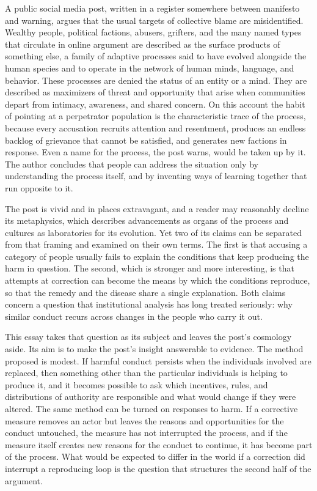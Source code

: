 \documentclass[11pt]{article}
\theoremstyle{definition}
\begin{document}
A public social media post, written in a register somewhere between manifesto and warning, argues that the usual targets of collective blame are misidentified. Wealthy people, political factions, abusers, grifters, and the many named types that circulate in online argument are described as the surface products of something else, a family of adaptive processes said to have evolved alongside the human species and to operate in the network of human minds, language, and behavior. These processes are denied the status of an entity or a mind. They are described as maximizers of threat and opportunity that arise when communities depart from intimacy, awareness, and shared concern. On this account the habit of pointing at a perpetrator population is the characteristic trace of the process, because every accusation recruits attention and resentment, produces an endless backlog of grievance that cannot be satisfied, and generates new factions in response. Even a name for the process, the post warns, would be taken up by it. The author concludes that people can address the situation only by understanding the process itself, and by inventing ways of learning together that run opposite to it.

The post is vivid and in places extravagant, and a reader may reasonably decline its metaphysics, which describes advancements as organs of the process and cultures as laboratories for its evolution. Yet two of its claims can be separated from that framing and examined on their own terms. The first is that accusing a category of people usually fails to explain the conditions that keep producing the harm in question. The second, which is stronger and more interesting, is that attempts at correction can become the means by which the conditions reproduce, so that the remedy and the disease share a single explanation. Both claims concern a question that institutional analysis has long treated seriously: why similar conduct recurs across changes in the people who carry it out.

This essay takes that question as its subject and leaves the post's cosmology aside. Its aim is to make the post's insight answerable to evidence. The method proposed is modest. If harmful conduct persists when the individuals involved are replaced, then something other than the particular individuals is helping to produce it, and it becomes possible to ask which incentives, rules, and distributions of authority are responsible and what would change if they were altered. The same method can be turned on responses to harm. If a corrective measure removes an actor but leaves the reasons and opportunities for the conduct untouched, the measure has not interrupted the process, and if the measure itself creates new reasons for the conduct to continue, it has become part of the process. What would be expected to differ in the world if a correction did interrupt a reproducing loop is the question that structures the second half of the argument.
\end{document}
